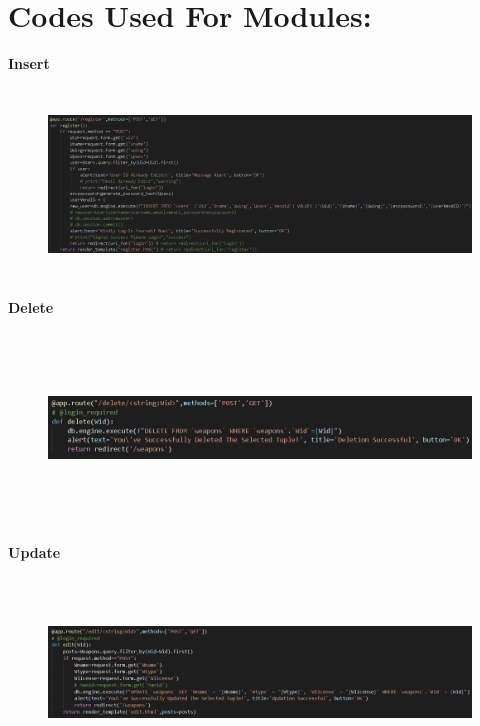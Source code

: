 \documentclass[12pt,a4paper]{report}
\begin{document}
\section{Codes Used For Modules:}
\begin{flushleft}
\textbf{Insert}\\
\end{flushleft}
\begin{figure}[hbtp]
\centering
\includegraphics[width=6in,height=2in]{../fig/Inser}\\
\end{figure}
\begin{flushleft}
\textbf{Delete}\\
\end{flushleft}
\begin{figure}[hbtp]
\centering
\includegraphics[width=6in,height=2in]{../fig/Delete}\\
\end{figure}
\newpage
\begin{flushleft}
\textbf{Update}\\
\end{flushleft}
\begin{figure}[hbtp]
\centering
\includegraphics[width=6in,height=2in]{../fig/Update}\\
\end{figure}
\end{document}
